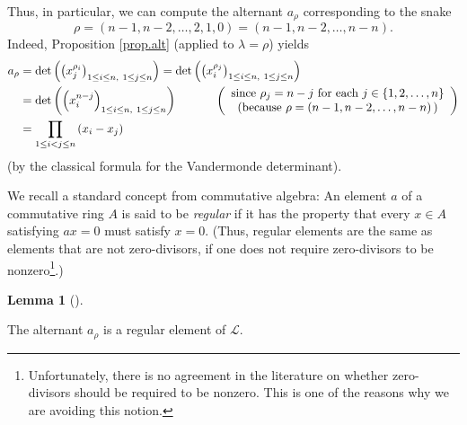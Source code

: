 \documentclass[numbers=enddot,12pt,final,onecolumn,notitlepage]{scrartcl}%
\theoremstyle{definition}
\newtheorem{lem}[theo]{Lemma}
\newenvironment{lemma}[1][]
{\begin{lem}[#1]\begin{leftbar}}
{\end{leftbar}\end{lem}}
\let\prodnonlimits\prod
\renewcommand{\prod}{\prodnonlimits\limits}
\newenvironment{verlong}{}{}
\begin{document}
\begin{verlong}
Thus, in particular, we can compute the alternant $a_{\rho}$ corresponding to
the snake
\[
\rho=\left(  n-1,n-2,\ldots,2,1,0\right)  =\left(  n-1,n-2,\ldots,n-n\right)
.
\]
Indeed, Proposition \ref{prop.alt} (applied to $\lambda=\rho$) yields%
\begin{align*}
a_{\rho}  &  =\det\left(  \left(  x_{j}^{\rho_{i}}\right)  _{1\leq i\leq
n,\ 1\leq j\leq n}\right)  =\det\left(  \left(  x_{i}^{\rho_{j}}\right)
_{1\leq i\leq n,\ 1\leq j\leq n}\right) \\
&  =\det\left(  \left(  x_{i}^{n-j}\right)  _{1\leq i\leq n,\ 1\leq j\leq
n}\right)  \ \ \ \ \ \ \ \ \ \ \left(
\begin{array}
[c]{c}%
\text{since }\rho_{j}=n-j\text{ for each }j\in\left\{  1,2,\ldots,n\right\} \\
\text{(because }\rho=\left(  n-1,n-2,\ldots,n-n\right)  \text{)}%
\end{array}
\right) \\
&  =\prod_{1\leq i<j\leq n}\left(  x_{i}-x_{j}\right)
\end{align*}
(by the classical formula for the Vandermonde determinant).
\end{verlong}

We recall a standard concept from commutative algebra: An element $a$ of a
commutative ring $A$ is said to be \textit{regular} if it has the property
that every $x\in A$ satisfying $ax=0$ must satisfy $x=0$. (Thus, regular
elements are the same as elements that are not zero-divisors, if one does not
require zero-divisors to be nonzero\footnote{Unfortunately, there is no
agreement in the literature on whether zero-divisors should be required to be
nonzero. This is one of the reasons why we are avoiding this notion.}.)

\begin{lemma}
\label{lem.alt.rho-reg}The alternant $a_{\rho}$ is a regular element of
$\mathcal{L}$.
\end{lemma}
\end{document}
